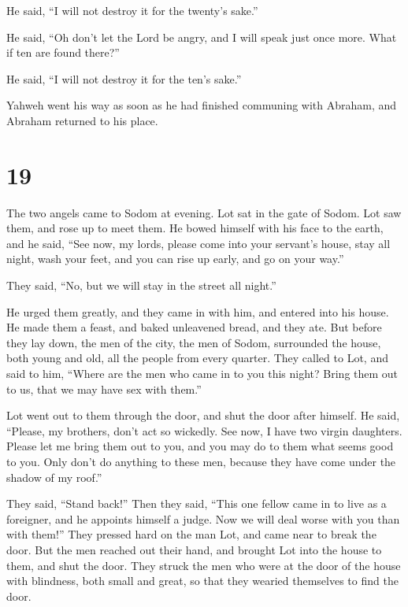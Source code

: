 He said, ``I will not destroy it for the twenty's sake.''

 He said, ``Oh don't let the Lord be angry, and I will
speak just once more. What if ten are found there?''

He said, ``I will not destroy it for the ten's sake.''

 Yahweh went his way as soon as he had finished communing
with Abraham, and Abraham returned to his place.

\hypertarget{section-18}{%
\section{19}\label{section-18}}

 The two angels came to Sodom at evening. Lot sat in the
gate of Sodom. Lot saw them, and rose up to meet them. He bowed himself
with his face to the earth,  and he said, ``See now, my
lords, please come into your servant's house, stay all night, wash your
feet, and you can rise up early, and go on your way.''

They said, ``No, but we will stay in the street all night.''

 He urged them greatly, and they came in with him, and
entered into his house. He made them a feast, and baked unleavened
bread, and they ate.  But before they lay down, the men of
the city, the men of Sodom, surrounded the house, both young and old,
all the people from every quarter.  They called to Lot,
and said to him, ``Where are the men who came in to you this night?
Bring them out to us, that we may have sex with them.''

 Lot went out to them through the door, and shut the door
after himself.  He said, ``Please, my brothers, don't act
so wickedly.  See now, I have two virgin daughters. Please
let me bring them out to you, and you may do to them what seems good to
you. Only don't do anything to these men, because they have come under
the shadow of my roof.''

 They said, ``Stand back!'' Then they said, ``This one
fellow came in to live as a foreigner, and he appoints himself a judge.
Now we will deal worse with you than with them!'' They pressed hard on
the man Lot, and came near to break the door.  But the
men reached out their hand, and brought Lot into the house to them, and
shut the door.  They struck the men who were at the door
of the house with blindness, both small and great, so that they wearied
themselves to find the door.

